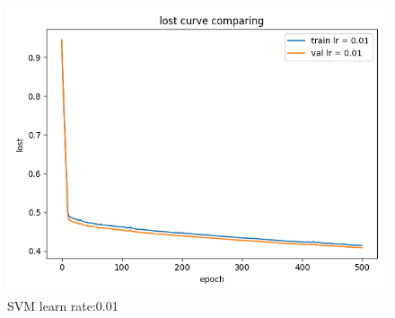 \documentclass[journal, a4paper]{IEEEtran}
\begin{document}
\begin{figure}[!htb]
	\begin{center}
	\includegraphics[width=\columnwidth]{lc_01}
	\caption{SVM learn rate:0.01}
	\label{fig:lc_01}
	\end{center}
\end{figure}
\end{document}
